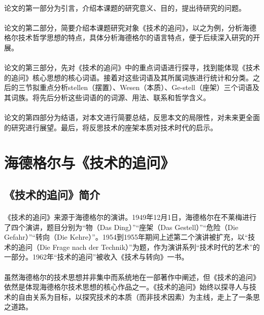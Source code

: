\documentclass{article}
\begin{document}
		\paragraph{}
        论文的第一部分为引言，介绍本课题的研究意义、目的，提出待研究的问题。
		\paragraph{}
        论文的第二部分，简要介绍本课题研究对象《技术的追问》，以之为例，分析海德格尔技术哲学思想的特点，具体分析海德格尔的语言特点，便于后续深入研究的开展。
        \paragraph{}
        论文的第三部分，先对《技术的追问》中的重点词语进行探寻，找到能体现《技术的追问》核心思想的核心词语。接着对这些词语及其所属词族进行统计和分类。之后的三节拟重点分析stellen（摆置）、Wesen（本质）、Ge-stell（座架）三个词语及其词族。将先后分析这些词语的的词源、用法、联系和哲学含义。
        \paragraph{}
        论文的第四部分为结语，对本文进行简要总结，反思本文的局限性，对未来更全面的研究进行展望。最后，将反思技术的座架本质对技术时代的启示。
\section{海德格尔与《技术的追问》} 
	\subsection{《技术的追问》简介}
		\paragraph{}
		《技术的追问》来源于海德格尔的演讲。1949年12月1日，海德格尔在不莱梅进行了四个演讲，题目分别为“物（Das Ding）”“座架（Das Gestell）”“危险（Die Gefahr）”“转向（Die Kehre）”。1954到1955年期间上述第二个演讲被扩充，以“技术的追问（Die Frage nach der Technik）”为题，作为演讲系列“技术时代的艺术”的一部分。1962年“技术的追问”被收入《技术与转向》一书。
		\paragraph{}
		虽然海德格尔的技术思想并非集中而系统地在一部著作中阐述，但《技术的追问》依然是体现海德格尔技术思想的核心作品之一。《技术的追问》始终以探寻人与技术的自由关系为目标，以探究技术的本质（而非技术因素）为主线，走上了一条思之道路。
\end{document}
